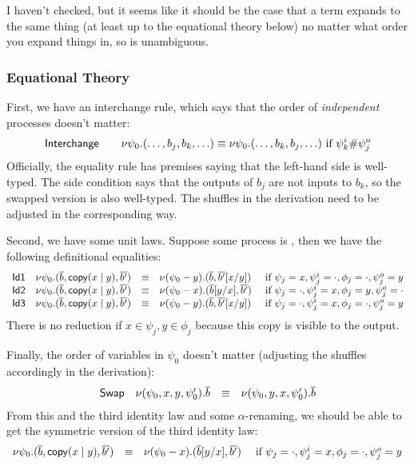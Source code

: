 \documentclass{article}
\newcommand\deq{\ensuremath{\equiv}}
\begin{document}
\begin{itemize}
I haven't checked, but it seems like it should be the case that a term
 expands to the same thing (at least up to
the equational theory below) no matter what order you expand things in,
so is unambiguous.
\end{itemize}

\subsubsection{Equational Theory}

First, we have an interchange rule, which says that the order of
\emph{independent} processes doesn't matter:
\[
\dsd{Interchange} \qquad
\cut{\psi_0}{(\ldots,b_j,b_k,\ldots)} \deq \cut{\psi_0}{(\ldots,b_k,b_j,\ldots)} 
\text{ if } \psi^i_k \# \psi^o_j
\]
Officially, the equality rule has premises saying that the left-hand
side is well-typed.  The side condition says that the outputs of $b_j$
are not inputs to $b_k$, so the swapped version is also well-typed.  The
shuffles in the derivation need to be adjusted in the corresponding
way.  

Second, we have some unit laws.  Suppose some process
 is , then we have
the following definitional equalities:
\[
\begin{array}{crcll}
\dsd{Id1} & \cut{\psi_0}{(\lst{b},\cpy{x}{y},\lst{b'})} & \deq & \cut{(\psi_0-y)}{(\lst{b},\lst{b'}[x/y])} & \text{ if } \psi_j = x, \psi_j^i = \cdot, \phi_j = \cdot, \psi_j^o = y\\
\dsd{Id2} & \cut{\psi_0}{(\lst{b},\cpy{x}{y},\lst{b'})} & \deq & \cut{(\psi_0-x)}{(\lst{b}[y/x],\lst{b'})} & \text{ if } \psi_j = \cdot, \psi_j^i = x, \phi_j = y, \psi_j^o = \cdot\\
\dsd{Id3} & \cut{\psi_0}{(\lst{b},\cpy{x}{y},\lst{b'})} & \deq & \cut{(\psi_0-y)}{(\lst{b},\lst{b'}[x/y])} & \text{ if } \psi_j = \cdot, \psi_j^i = x, \phi_j = \cdot, \psi_j^o = y\\
\end{array}
\]
There is no reduction if $x \in \psi_j,y \in \phi_j$ because this copy
is visible to the output.  

Finally, the order of variables in $\psi_0$ doesn't matter (adjusting
the shuffles accordingly in the derivation): 
\[
\begin{array}{crcll}
\dsd{Swap} & \cut{(\psi_0,x,y,\psi_0')}{\lst{b}} & \deq & \cut{(\psi_0,y,x,\psi_0')}{\lst{b}}
\end{array}
\]
From this and the third identity law and some $\alpha$-renaming, we
should be able to get the symmetric version of the third identity law:
\[
\begin{array}{rcll}
\cut{\psi_0}{(\lst{b},\cpy{x}{y},\lst{b'})} & \deq & \cut{(\psi_0-x)}{(\lst{b}[y/x],\lst{b'})} & \text{ if } \psi_j = \cdot, \psi_j^i = x, \phi_j = \cdot, \psi_j^o = y\\
\end{array}
\]
\end{document}

